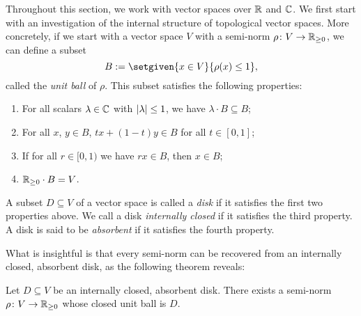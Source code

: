 Throughout this section, we work with vector spaces over \(\mathbb R\) and \(\mathbb C\). We first start with an investigation of the internal structure of topological vector spaces. More concretely, if we start with a vector space \(V\) with a semi-norm \(\rho \colon V \to \mathbb R_{\geq 0}\), we can define a subset \[B \defeq \setgiven{x \in V}{\rho(x) \leq 1},\] called the \emph{unit ball} of \(\rho\). This subset satisfies the following properties:

\begin{enumerate}
    \item For all scalars \(\lambda \in \mathbb C\) with \(\lvert\lambda\rvert \leq 1\), we have \(\lambda \cdot B \subseteq B\);
    \item For all \(x\), \(y \in B\), \(tx + (1-t)y \in B\) for all \(t \in [0,1]\);
    \item If for all \(r \in [0,1)\) we have \(rx \in B\), then \(x \in B\);
    \item \(\mathbb R_{\geq 0} \cdot B = V\).
\end{enumerate}

\begin{definition}
    A subset \(D \subseteq V\) of a vector space is called a \emph{disk} if it satisfies the first two properties above. We call a disk \textit{internally closed} if it satisfies the third property. A disk is said to be \emph{absorbent} if it satisfies the fourth property. 
\end{definition}


What is insightful is that every semi-norm can be recovered from an internally closed, absorbent disk, as the following theorem reveals:

\begin{theorem}
   Let \(D \subseteq V\) be an internally closed, absorbent disk. There exists a semi-norm \(\rho \colon V \to \mathbb R_{\geq 0}\) whose closed unit ball is \(D\). 
\end{theorem}

